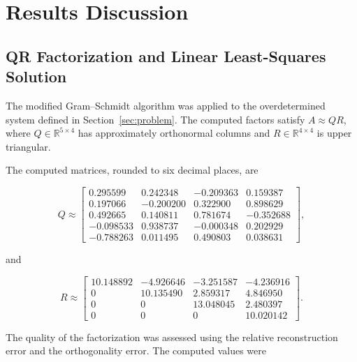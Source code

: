 \section{Results Discussion}
\label{sec:results}

\subsection{QR Factorization and Linear Least-Squares Solution}
\label{subsec:problem1-results}

The modified Gram--Schmidt algorithm was applied to the
overdetermined system defined in Section~\ref{sec:problem}. The
computed factors satisfy $A\approx QR$, where
$Q\in\mathbb{R}^{5\times4}$ has approximately orthonormal columns
and $R\in\mathbb{R}^{4\times4}$ is upper triangular.

The computed matrices, rounded to six decimal places, are

\begin{equation}
    Q\approx
    \begin{bmatrix}
        0.295599  & 0.242348  & -0.209363 & 0.159387  \\
        0.197066  & -0.200200 & 0.322900  & 0.898629  \\
        0.492665  & 0.140811  & 0.781674  & -0.352688 \\
        -0.098533 & 0.938737  & -0.000348 & 0.202929  \\
        -0.788263 & 0.011495  & 0.490803  & 0.038631
    \end{bmatrix},
    \label{eq:computed-Q}
\end{equation}

and

\begin{equation}
    R\approx
    \begin{bmatrix}
        10.148892 & -4.926646 & -3.251587 & -4.236916 \\
        0         & 10.135490 & 2.859317  & 4.846950  \\
        0         & 0         & 13.048045 & 2.480397  \\
        0         & 0         & 0         & 10.020142
    \end{bmatrix}.
    \label{eq:computed-R}
\end{equation}

The quality of the factorization was assessed using the relative
reconstruction error and the orthogonality error. The computed
values were

